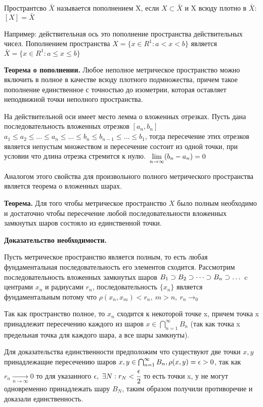 \documentclass[12pt]{report}
\renewcommand{\[}{$\\\displaystyle}
\renewcommand{\]}{\\$}
\renewcommand{\[}{$\\\displaystyle}
\newcommand{\sep}{,\ }
\newcommand{\tth}[1][]{\textbf{Теорема#1.}}
\begin{document}
Пространтсво $\bar X$ называется пополнением X, если $X \subset \bar{X}$ и X
всюду плотно в $\bar X$: $[X] = \bar X$


Например: действительная ось это пополнение пространства действительных чисел.
Пополнением пространства $X = \{x \in R^1: a < x < b\}$ является
$\bar{X} = \{x \in R^1: a \leq x \leq b\}$

\tth[ о пополнении] Любое неполное метрическое пространство можно
включить в полное в качестве всюду плотного подмножества, причем такое
пополнение единственное с точностью до изометрии, которая оставляет неподвижной
точки неполного пространства.

На действительной оси имеет место лемма о вложенных отрезках. Пусть дана
последовательность вложенных отрезков $[a_n, b_n]$ $a_1 \leq a_2 \leq \dots \leq
a_n \leq \dots \leq b_n \leq b_{n-1} \leq \dots \leq b_1 $, тогда пересечение
этих отрезков является непустым множеством и пересечение состоит из одной
точки, при условии что длина отрезка стремится к нулю.
\[ \lim_{n \rightarrow \infty}(b_n - a_n) = 0\]

Аналогом этого свойства для произвольного полного метрического пространства
является теорема о вложенных шарах.

\tth[] Для того чтобы метрическое пространство $X$ было полным
необходимо и достаточно чтобы пересечение любой последовательности вложенных
замкнутых шаров состояло из единственной точки.

\textbf{Доказательство необходимости.}

Пусть метрическое пространство является полным, то есть любая фундаментальная
последовательность его элементов сходится. Рассмотрим последовательность
вложенных замкнутых шаров
\[ B_{1} \supset B_{2} \supset \dots \supset B_{n} \supset \dots\]
c центрами $x_{n}$ и радиусами $r_{n}$, последовательность $\{x_n\}$ является
фундаментальным потому что $\rho(x_n, x_m) < r_n\sep m > n\sep r_n\rightarrow_0$

Так как пространство полное, то $x_{n}$ сходится к некоторой точке x,
причем точка x принадлежит пересечению каждого из шаров $x \in \bigcap _{n = 1}^{\infty} B_{n}$ (так как точка x
предельная точка для каждого шара, а все шары замкнуты).

Для доказательства единственности предположим что существуют две точки $x, y$
принадлежащие пересечению шаров
$x, y \in \bigcap _{n = 1}^{\infty} B_{n}, \\ \rho(x, y) = \epsilon > 0$, так как
$r_n \xrightarrow[n \rightarrow \infty]{} 0$ то для указанного
$\epsilon \sep \exists N: r_N < \cfrac\epsilon2$
то есть точки x, у не могут одновременно принадлежать шару $B_N$, таким образом
получили противоречие и доказали единственность.
\end{document}
